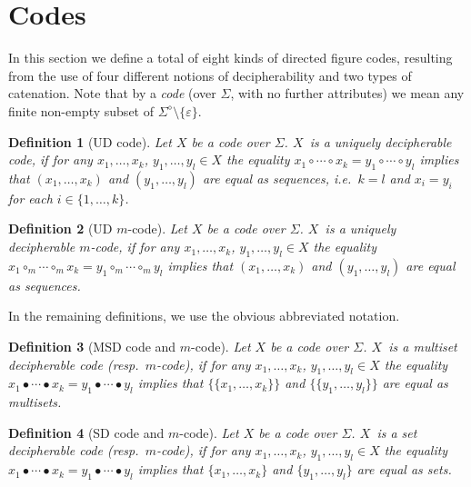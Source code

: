 \documentclass[final,nomarks]{dmtcs-episciences}
\newcommand{\e}{\varepsilon}
\newcommand{\NN}[1]{\{1,\ldots,#1\}}
\newcommand{\dfplus}[1]{#1^{\diamond}}
\newtheorem{definition}{Definition}
\begin{document}
\section{Codes}
\label{sec:codes}

In this section we define a total of eight kinds of directed
figure codes, resulting from the use of four different notions
of decipherability and two types of catenation. Note that by a
\textit{code} (over $\Sigma$, with no further attributes) we
mean any finite non-empty subset of $\dfplus{\Sigma}\setminus\{\e\}$.


\begin{definition}[UD code]
Let $X$ be a code over $\Sigma$. $X$~is a \emph{uniquely
decipherable code}, if for any $x_1,\ldots,x_k$,
$y_1,\ldots,y_l\in X$ the equality $x_1\circ\cdots\circ
x_k=y_1\circ\cdots\circ y_l$ implies that $(x_1,\ldots,x_k)$ and
$(y_1,\ldots,y_l)$ are equal as sequences, \textit{i.e.}\ $k=l$
and $x_i=y_i$ for each $i\in\NN{k}$.
\end{definition}


\begin{definition}[UD $m$-code]
Let $X$ be a code over $\Sigma$. $X$~is a \emph{uniquely
decipherable $m$-code}, if for any $x_1,\ldots,x_k$,
$y_1,\ldots,y_l\in X$ the equality $x_1\circ_m\cdots\circ_m
x_k=y_1\circ_m\cdots\circ_m y_l$ implies that $(x_1,\ldots,x_k)$
and $(y_1,\ldots,y_l)$ are equal as sequences.
\end{definition}


In the remaining definitions, we use the obvious abbreviated notation.


\begin{definition}[MSD code and $m$-code]
Let $X$ be a code over $\Sigma$. $X$~is a \emph{multiset
decipherable code} (resp.\ \emph{$m$-code}), if for any
$x_1,\ldots,x_k$, $y_1,\ldots,y_l\in X$ the equality
$x_1\bullet\cdots\bullet x_k=y_1\bullet\cdots\bullet y_l$
implies that $\{\!\!\{x_1,\ldots,x_k\}\!\!\}$ and
$\{\!\!\{y_1,\ldots,y_l\}\!\!\}$ are equal as multisets.
\end{definition}


\begin{definition}[SD code and $m$-code]
Let $X$ be a code over $\Sigma$. $X$~is a \emph{set decipherable
code} (resp.\ \emph{$m$-code}), if for any $x_1,\ldots,x_k$,
$y_1,\ldots,y_l\in X$ the equality $x_1\bullet\cdots\bullet
x_k=y_1\bullet\cdots\bullet y_l$ implies that
$\{x_1,\ldots,x_k\}$ and $\{y_1,\ldots,y_l\}$ are equal as sets.
\end{definition}
\end{document}

